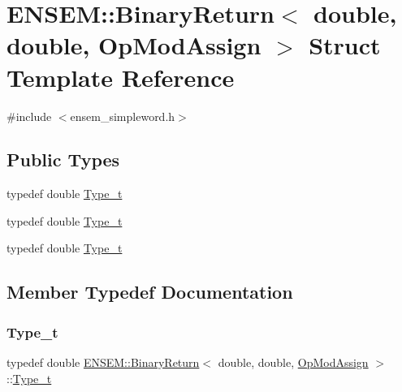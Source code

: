 \hypertarget{structENSEM_1_1BinaryReturn_3_01double_00_01double_00_01OpModAssign_01_4}{}\section{E\+N\+S\+EM\+:\+:Binary\+Return$<$ double, double, Op\+Mod\+Assign $>$ Struct Template Reference}
\label{structENSEM_1_1BinaryReturn_3_01double_00_01double_00_01OpModAssign_01_4}


{\ttfamily \#include $<$ensem\+\_\+simpleword.\+h$>$}

\subsection*{Public Types}
\begin{DoxyCompactItemize}
\item 
typedef double \mbox{\hyperlink{structENSEM_1_1BinaryReturn_3_01double_00_01double_00_01OpModAssign_01_4_a5d4ff64f4601dee1ca69a78e3ed694e0}{Type\+\_\+t}}
\item 
typedef double \mbox{\hyperlink{structENSEM_1_1BinaryReturn_3_01double_00_01double_00_01OpModAssign_01_4_a5d4ff64f4601dee1ca69a78e3ed694e0}{Type\+\_\+t}}
\item 
typedef double \mbox{\hyperlink{structENSEM_1_1BinaryReturn_3_01double_00_01double_00_01OpModAssign_01_4_a5d4ff64f4601dee1ca69a78e3ed694e0}{Type\+\_\+t}}
\end{DoxyCompactItemize}


\subsection{Member Typedef Documentation}
\mbox{\label{structENSEM_1_1BinaryReturn_3_01double_00_01double_00_01OpModAssign_01_4_a5d4ff64f4601dee1ca69a78e3ed694e0}} 
\subsubsection{\texorpdfstring{Type\_t}{Type\_t}\hspace{0.1cm}{\footnotesize\ttfamily [1/3]}}
{\footnotesize\ttfamily typedef double \mbox{\hyperlink{structENSEM_1_1BinaryReturn}{E\+N\+S\+E\+M\+::\+Binary\+Return}}$<$ double, double, \mbox{\hyperlink{structENSEM_1_1OpModAssign}{Op\+Mod\+Assign}} $>$\+::\mbox{\hyperlink{structENSEM_1_1BinaryReturn_3_01double_00_01double_00_01OpModAssign_01_4_a5d4ff64f4601dee1ca69a78e3ed694e0}{Type\+\_\+t}}}

